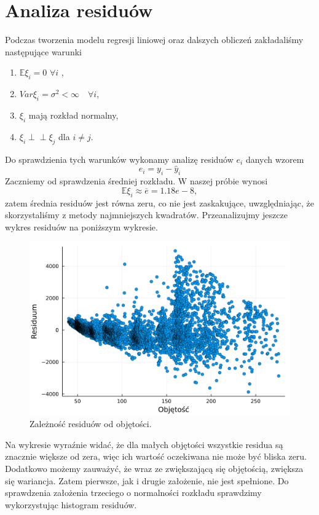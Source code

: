 \documentclass[12pt]{article}
\theoremstyle{exer}
\begin{document}
 \section{Analiza residuów}
 	Podczas tworzenia modelu regresji liniowej oraz dalszych obliczeń zakładaliśmy następujące warunki
 	\begin{enumerate}
 		\item $\mathbb{E}\xi_i=0$ $\forall i$ ,
 		\item $Var\xi_i=\sigma^2<\infty\quad\forall i$,
 		\item $\xi_i$ mają rozkład normalny,
 		\item $\xi_i\perp\!\!\!\perp\xi_j$ dla $i\neq j$.
 	\end{enumerate}
 	Do sprawdzienia tych warunków wykonamy analizę residuów $e_i$ danych wzorem
 	\begin{equation}
 		e_i=y_i-\hat y_i
 	\end{equation}
    Zaczniemy od sprawdzenia średniej rozkładu. W naszej próbie wynosi
	\begin{equation}
		\mathbb{E}\xi_i\approx\overline{e}=1.18e-8,
	\end{equation}
	zatem średnia residuów jest równa zeru, co nie jest zaskakujące, uwzględniając, że skorzystaliśmy z metody najmniejszych kwadratów. Przeanalizujmy jeszcze wykres residuów na poniższym wykresie.
	\begin{figure}[H]
		\centering
		\includegraphics[width=4\columnwidth/5]{images/Budnik/res_V.png}
		\caption{Zależność residuów od objętości.}
	\end{figure}
	Na wykresie wyraźnie widać, że dla małych objętości wszystkie residua są znacznie większe od zera, więc ich wartość oczekiwana nie może być bliska zeru. Dodatkowo możemy zauważyć, że wraz ze zwiększającą się objętością, zwiększa się wariancja. Zatem pierwsze, jak i drugie założenie, nie jest spełnione. Do sprawdzenia założenia trzeciego o normalności rozkładu sprawdzimy wykorzystując histogram residuów.
\end{document}
